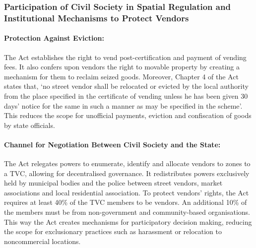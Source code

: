\documentclass[a4paper, 12pt, twoside]{article}
\begin{document}
{\subsubsection*{Participation of Civil Society in Spatial Regulation and Institutional Mechanisms to Protect Vendors}

\paragraph*{Protection Against Eviction:} 

The Act establishes the right to vend post-certification and payment of vending fees. It also confers upon vendors the right to movable property by creating a mechanism for them to reclaim seized goods. Moreover, Chapter 4 of the Act states that, `no street vendor shall be relocated or evicted by the local authority from the place specified in the certificate of vending unless he has been given 30 days’ notice for the same in such a manner as may be specified in the scheme'. This reduces the scope for unofficial payments, eviction and confiscation of goods by state officials. 

\paragraph*{Channel for Negotiation Between Civil Society and the State:}

The Act relegates powers to enumerate, identify and allocate vendors to zones to a TVC, allowing for decentralised governance. It redistributes powers exclusively held by municipal bodies and the police between street vendors, market associations and local residential association. To protect vendors’ rights, the Act requires at least 40\% of the TVC members to be vendors. An additional 10\% of the members must be from non-government and community-based organisations. This way the Act creates mechanisms for participatory decision making, reducing the scope for exclusionary practices such as harassment or relocation to noncommercial locations.

}
\end{document}

